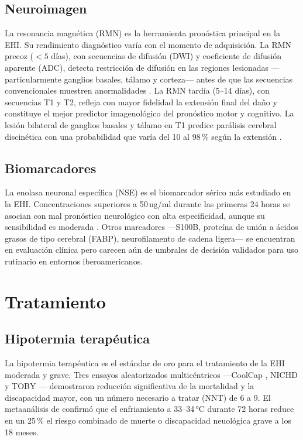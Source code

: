 \documentclass[12pt]{article}
\begin{document}
\subsection{Neuroimagen}
\label{subsec:rmn}

La resonancia magnética (RMN) es la herramienta pronóstica principal en la EHI.
Su rendimiento diagnóstico varía con el momento de adquisición. La RMN precoz
($< 5$ días), con secuencias de difusión (DWI) y coeficiente de difusión aparente
(ADC), detecta restricción de difusión en las regiones lesionadas ---particularmente
ganglios basales, tálamo y corteza--- antes de que las secuencias convencionales
muestren anormalidades \parencite{ferriero2004}. La RMN tardía (5--14 días), con
secuencias T1 y T2, refleja con mayor fidelidad la extensión final del daño y
constituye el mejor predictor imagenológico del pronóstico motor y cognitivo. La
lesión bilateral de ganglios basales y tálamo en T1 predice parálisis cerebral
discinética con una probabilidad que varía del 10 al 98\,\% según la extensión
\parencite{garciaalix2012}.

\subsection{Biomarcadores}
\label{subsec:biomark}

La enolasa neuronal específica (NSE) es el biomarcador sérico más estudiado en la EHI.
Concentraciones superiores a 50\,ng/ml durante las primeras 24 horas se asocian con
mal pronóstico neurológico con alta especificidad, aunque su sensibilidad es moderada
\parencite{kurinczuk2010}. Otros marcadores ---S100B, proteína de unión a ácidos grasos
de tipo cerebral (FABP), neurofilamento de cadena ligera--- se encuentran en evaluación
clínica pero carecen aún de umbrales de decisión validados para uso rutinario en
entornos iberoamericanos.

\section{Tratamiento}
\label{sec:tratamiento}

\subsection{Hipotermia terapéutica}
\label{subsec:hipotermia}

La hipotermia terapéutica es el estándar de oro para el tratamiento de la EHI moderada
y grave. Tres ensayos aleatorizados multicéntricos ---CoolCap \parencite{gluckman2005},
NICHD \parencite{shankaran2005} y TOBY \parencite{azzopardi2008}--- demostraron
reducción significativa de la mortalidad y la discapacidad mayor, con un número
necesario a tratar (NNT) de 6 a 9. El metaanálisis de \citet{edwards2010} confirmó
que el enfriamiento a 33--34\,°C durante 72 horas reduce en un 25\,\% el riesgo
combinado de muerte o discapacidad neuológica grave a los 18 meses.
\end{document}

